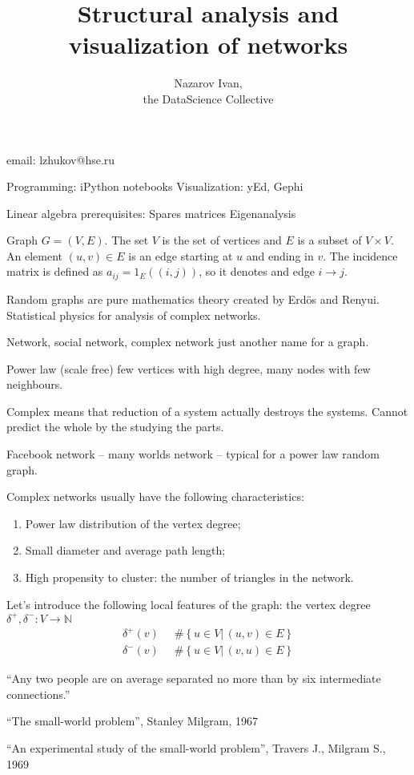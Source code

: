 \documentclass[a4paper]{article}
\title{Structural analysis and visualization of networks}
\author{Nazarov Ivan, \rus{101мНОД(ИССА)}\\the DataScience Collective}
\newcommand{\obj}[1]{{\left\{ #1 \right \}}}
\newcommand{\brac}[1]{{\left ( #1 \right )}}
\newcommand{\induc}[1]{{\left . #1 \right \vert}}
\newcommand{\Ntrl}{\mathbb{N}}
\newcommand{\defn}{\mathop{\overset{\Delta}{=}}\nolimits}
\begin{document}
\maketitle

email: lzhukov@hse.ru

Programming: iPython notebooks
Visualization: yEd, Gephi

Linear algebra prerequisites:
	Spares matrices
	Eigenanalysis


Graph $G=(V,E)$. The set $V$ is the set of vertices and $E$ is a subset of $V\times V$.
An element $(u,v)\in E$ is an edge starting at $u$ and ending in $v$.
The incidence matrix is defined as $a_{ij}=1_E\brac{(i,j)}$, so it denotes and edge $i\to j$.

Random graphs are pure mathematics theory created by Erd\"os and Renyui.
Statistical physics for analysis of complex networks.

Network, social network, complex network just another name for a graph.

Power law (scale free) few vertices with high degree, many nodes with few neighbours.

Complex means that reduction of a system actually destroys the systems.
Cannot predict the whole by the studying the parts.

Facebook network -- many worlds network -- typical for a power law random graph.

Complex networks usually have the following characteristics: \begin{enumerate}
	\item Power law distribution of the vertex degree;
	\item Small diameter and average path length;
	\item High propensity to cluster: the number of triangles in the network.
\end{enumerate}

Let's introduce the following local features of the graph: the vertex degree $\delta^+,\delta^-:V\to \Ntrl$
\begin{align*}
	\delta^+(v) &\defn \#\obj{\induc{u\in V}\, (u,v)\in E }\\
	\delta^-(v) &\defn \#\obj{\induc{u\in V}\, (v,u)\in E }
\end{align*}

``Any two people are on average separated no more than by six intermediate connections.''
\begin{item}
\item ``The small-world problem'', Stanley Milgram, 1967
\item ``An experimental study of the small-world problem'', Travers J., Milgram S., 1969
\end{item}
\end{document}
